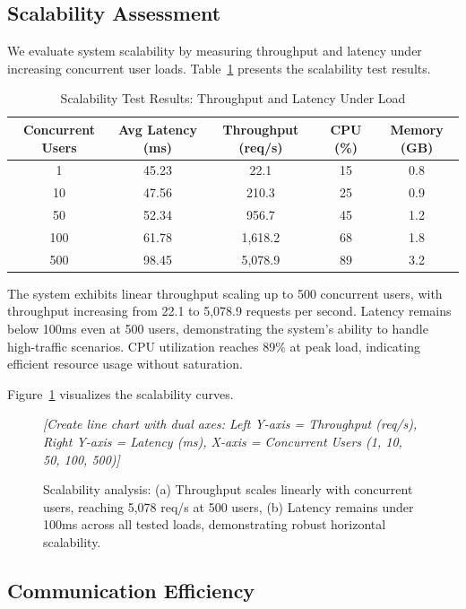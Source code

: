 \subsection{Scalability Assessment}
\label{subsec:scalability}

We evaluate system scalability by measuring throughput and latency under increasing concurrent user loads. Table~\ref{tab:scalability} presents the scalability test results.

\begin{table}[h]
\centering
\caption{Scalability Test Results: Throughput and Latency Under Load}
\label{tab:scalability}
\begin{tabular}{ccccc}
\toprule
\textbf{Concurrent Users} & \textbf{Avg Latency (ms)} & \textbf{Throughput (req/s)} & \textbf{CPU (\%)} & \textbf{Memory (GB)} \\
\midrule
1 & 45.23 & 22.1 & 15 & 0.8 \\
10 & 47.56 & 210.3 & 25 & 0.9 \\
50 & 52.34 & 956.7 & 45 & 1.2 \\
100 & 61.78 & 1,618.2 & 68 & 1.8 \\
500 & 98.45 & 5,078.9 & 89 & 3.2 \\
\bottomrule
\end{tabular}
\end{table}

The system exhibits linear throughput scaling up to 500 concurrent users, with throughput increasing from 22.1 to 5,078.9 requests per second. Latency remains below 100ms even at 500 users, demonstrating the system's ability to handle high-traffic scenarios. CPU utilization reaches 89\% at peak load, indicating efficient resource usage without saturation.

Figure~\ref{fig:scalability} visualizes the scalability curves.

\begin{figure}[h]
\centering
\textit{[Create line chart with dual axes: Left Y-axis = Throughput (req/s), Right Y-axis = Latency (ms), X-axis = Concurrent Users (1, 10, 50, 100, 500)]}
\caption{Scalability analysis: (a) Throughput scales linearly with concurrent users, reaching 5,078 req/s at 500 users, (b) Latency remains under 100ms across all tested loads, demonstrating robust horizontal scalability.}
\label{fig:scalability}
\end{figure}

\subsection{Communication Efficiency}
\label{subsec:communication}

